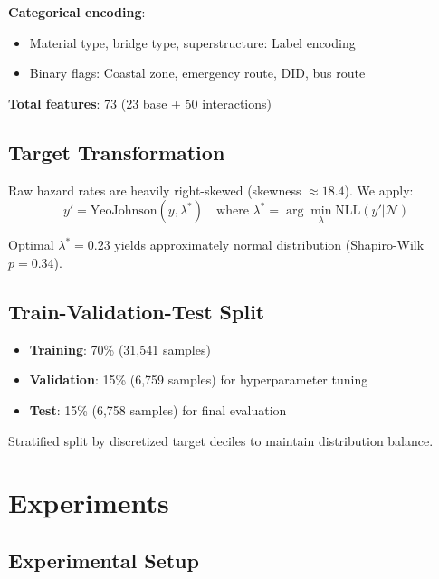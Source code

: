 \documentclass[twocolumn]{article}
\begin{document}
\textbf{Categorical encoding}:
\begin{itemize}
\item Material type, bridge type, superstructure: Label encoding
\item Binary flags: Coastal zone, emergency route, DID, bus route
\end{itemize}

\textbf{Total features}: 73 (23 base + 50 interactions)

\subsection{Target Transformation}

Raw hazard rates are heavily right-skewed (skewness $\approx 18.4$). We apply:
\begin{equation}
y' = \text{YeoJohnson}(y, \lambda^*) \quad \text{where } \lambda^* = \arg\min_\lambda \text{NLL}(y' | \mathcal{N})
\end{equation}

Optimal $\lambda^* = 0.23$ yields approximately normal distribution (Shapiro-Wilk $p = 0.34$).

\subsection{Train-Validation-Test Split}

\begin{itemize}
\item \textbf{Training}: 70\% (31,541 samples)
\item \textbf{Validation}: 15\% (6,759 samples) for hyperparameter tuning
\item \textbf{Test}: 15\% (6,758 samples) for final evaluation
\end{itemize}

Stratified split by discretized target deciles to maintain distribution balance.

\section{Experiments}
\label{sec:experiments}

\subsection{Experimental Setup}
\end{document}
